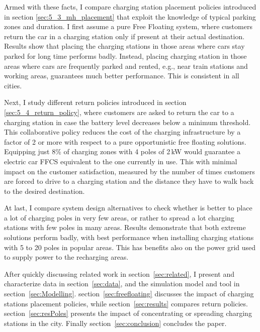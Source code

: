 Armed with these facts, I compare charging station placement policies introduced in section \ref{sec:5_3_mh_placement} that exploit the knowledge of typical parking zones and duration. I first assume a pure Free Floating system, where customers return the car in a charging station only if present at their actual destination.
Results show that placing the charging stations in those areas where cars stay parked for long time performs badly. Instead, placing charging station in those areas where cars are frequently parked and rented, e.g., near train stations and working areas, guarantees much better performance. This is consistent in all cities.

Next, I study different return policies introduced in section \ref{sec:5_4_return_policy}, where customers are asked to return the car to a charging station in case the battery level decreases below a minimum threshold. This collaborative policy reduces the cost of the charging infrastructure by a factor of 2 or more with respect to a pure opportunistic free floating solutions. Equipping just 8\% of charging zones with 4 poles of 2\,kW would guarantee a electric car FFCS equivalent to the one currently in use.
This with minimal impact on the customer satisfaction, measured by the number of times customers are forced to drive to a charging station and the distance they have to walk back to the desired destination.

At last, I compare system design alternatives to check whether is better to place a lot of charging poles in very few areas, or rather to spread a lot charging stations with few poles in many areas. Results demonstrate that both extreme solutions perform badly, with best performance when installing charging stations with  5 to 20 poles in popular areas. This has benefits also on the power grid used to supply power to the recharging areas.


After quickly discussing related work in section~\ref{sec:related}, I present and characterize data in section~\ref{sec:data}, and the simulation model and tool in section~\ref{sec:Modelling}. section~\ref{sec:freefloating} discusses the impact of charging stations placement policies, while section~\ref{sec:results} compares return policies. section~\ref{sec:resPoles} presents the impact of concentrating or spreading charging stations in the city. Finally section~\ref{sec:conclusion} concludes the paper.
